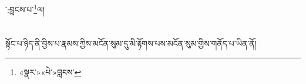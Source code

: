 ་:བླངས་པ་\footnote{«སྣར་»«པེ་»བླངས་}ལ།\chapter{ }སྟོང་པ་ཉིད་ནི་བྱིས་པ་རྣམས་ཀྱིས་མངོན་སུམ་དུ་མི་རྟོགས་པས་མངོན་སུམ་གྱིས་གནོད་པ་ཡིན་ནོ།\cha